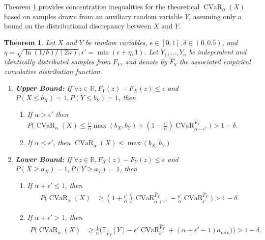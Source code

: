 \documentclass[acmlarge, manuscript, screen, review, natbib=false, oneside]{acmart}
\newtheorem{theorem}{Theorem}[section]
\DeclareMathOperator{\CVaR}{CVaR}
\begin{document}
Theorem \ref{thm:ecdf_y_bound_cvar_x} provides concentration inequalities for the theoretical $\CVaR_\alpha(X)$ based on samples drawn from an auxiliary random variable $Y$, assuming only a bound on the distributional discrepancy between $X$ and $Y$.
\begin{theorem}
	\label{thm:ecdf_y_bound_cvar_x}
	Let $X$ and $Y$ be random variables, $\epsilon \in [0, 1], \delta\in (0,0.5)$, and $\eta = \sqrt{\ln(1/\delta)/(2n)}, \epsilon'=\min(\epsilon+\eta, 1)$. Let $Y_1, \dots, Y_n$ be independent and identically distributed samples from $F_Y$, and denote by $\hat{F}_Y$ the associated empirical cumulative distribution function.
	\begin{enumerate}
		\item \textbf{Upper Bound:} If $\forall z\in \mathbb{R},F_Y(z)-F_X(z)\leq \epsilon$ and $P(X\leq b_X)=1, P(Y\leq b_Y)=1$, then
		
		\begin{enumerate}
			\item If $\alpha > \epsilon'$ then $P\Big(\CVaR_\alpha(X) \leq \frac{\epsilon'}{\alpha}\max(b_X,b_Y) 
			+ (1 - \frac{\epsilon'}{\alpha})\CVaR_{\alpha-\epsilon'}^{\hat{F}_Y}\Big)>1-\delta$. 
			
			\item If $\alpha \leq \epsilon'$, then $\CVaR_\alpha(X)\leq \max(b_X,b_Y)$
		\end{enumerate}
		
		\item \textbf{Lower Bound:} If $\forall z\in \mathbb{R},F_X(z)-F_Y(z)\leq \epsilon$ and $P(X\geq a_X)=1,P(Y\geq a_Y)=1$, then \begin{enumerate}
			\item If $\alpha+\epsilon' \leq 1$, then \begin{equation}
				\begin{aligned}
					P\Big(\CVaR_{\alpha}(X)&\geq (1+\frac{\epsilon'}{\alpha})\CVaR_{\alpha+\epsilon'}^{\hat{F}_Y} 
					-\frac{\epsilon'}{\alpha} \CVaR_{\epsilon'}^{\hat{F}_Y}\Big)>1-\delta.
				\end{aligned}
			\end{equation}
			
			\item If $\alpha+\epsilon' > 1$, then \begin{equation}
				\begin{aligned}
					P\Big(\CVaR_\alpha(X) &\geq \frac{1}{\alpha}\big(\mathbb{E}_{\hat{F}_Y}[Y] - \epsilon' \CVaR_{\epsilon'}^{\hat{F}_Y}
					+ (\alpha+\epsilon'-1)a_{min}\big) \Big) > 1-\delta.
				\end{aligned}
			\end{equation}
		\end{enumerate}
	\end{enumerate}
\end{theorem}
\end{document}
